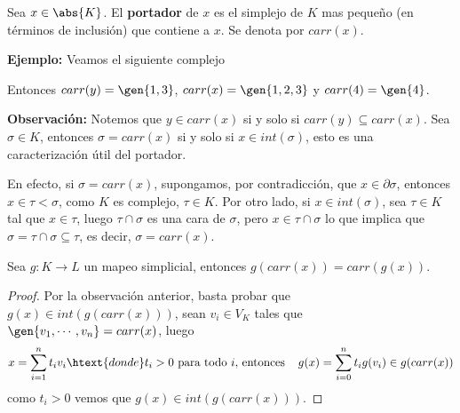 \documentclass{article}
\begin{document}
\vspace{2mm}
\begin{dfn}
    Sea $x\in\abs{K}$. El \textbf{portador} de $x$ es el simplejo de $K$ mas pequeño (en términos
    de inclusión) que contiene a $x$. Se denota por $carr(x)$.
\end{dfn}
\noindent\textbf{Ejemplo:} Veamos el siguiente complejo
\begin{center}
\end{center}
Entonces $carr(y)=\gen{1,3}$, $carr(x)=\gen{1,2,3}$ y $carr(4)=\gen{4}$.

\vspace{2mm}
\noindent\textbf{Observación:} Notemos que $y\in carr(x)$ si y solo si $carr(y)\subseteq carr(x)$.
Sea $\sigma\in K$, entonces $\sigma=carr(x)$ si y solo si $x\in int(\sigma)$, esto es una 
caracterización útil del portador.

\vspace{2mm}
\noindent En efecto, si $\sigma=carr(x)$, supongamos, por contradicción, que $x\in\partial\sigma$,
entonces $x\in\tau<\sigma$, como $K$ es complejo, $\tau\in K$. Por otro lado, si 
$x\in int(\sigma)$, sea $\tau\in K$ tal que $x\in\tau$, luego $\tau\cap\sigma$ es una cara de 
$\sigma$, pero $x\in\tau\cap\sigma$ lo que implica que $\sigma=\tau\cap\sigma\subseteq\tau$, es
decir, $\sigma=carr(x)$.

\vspace{2mm}
\begin{prop}
    Sea $g:K\to L$ un mapeo simplicial, entonces $g(carr(x))=carr(g(x))$.
\end{prop}
\begin{proof}
    Por la observación anterior, basta probar que $g(x)\in int(g(carr(x)))$, sean $v_{i}\in V_{K}$
    tales que $\gen{v_{1},\cdots,v_{n}}=carr(x)$, luego
    \begin{equation*}
        x=\sum_{i=1}^{n}t_{i}v_{i}\htext{donde}t_{i}>0\text{ para todo }i\text{, entonces}
        \hspace{4mm}g(x)=\sum_{i=0}^{n}t_{i}g(v_{i})\in g(carr(x))
    \end{equation*}
    como $t_{i}>0$ vemos que $g(x)\in int(g(carr(x)))$.
\end{proof}
\end{document}
